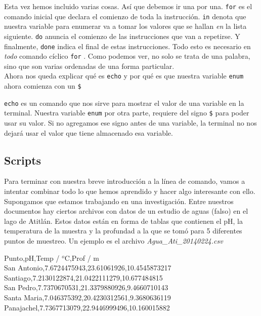 \documentclass[10pt,letterpaper]{article}
\newcommand{\inlinecode}[1]{
\colorbox{light-gray}{\texttt{#1}}
}
\newenvironment{Code}
{
\begin{lrbox}{\selvestebox}%
\begin{minipage}{\dimexpr\columnwidth-2\fboxsep\relax}
\fontfamily{\ttdefault}\selectfont
}
{\end{minipage}\end{lrbox}%
\begin{center}
\colorbox{light-gray}{\usebox{\selvestebox}}
\end{center}
}
\begin{document}
Esta vez hemos incluido varias cosas. As\'i que debemos ir una por una. \inlinecode{for} es el comando inicial que declara el comienzo de toda la instrucci\'on. \inlinecode{in} denota que nuestra variable para enumerar va a tomar los valores que se hallan \emph{en} la lista siguiente. \inlinecode{do} anuncia el comienzo de las instrucciones que van a repetirse. Y finalmente, \inlinecode{done} indica el final de estas instrucciones. Todo esto es necesario en \emph{todo} comando c\'iclico \inlinecode{for}. Como podemos ver, no solo se trata de una palabra, sino que son varias ordenadas de una forma particular.\\

Ahora nos queda explicar qu\'e es \inlinecode{echo} y por qu\'e es que nuestra variable \inlinecode{enum} ahora comienza con un \inlinecode{\$} \inlinecode{echo} es un comando que nos sirve para mostrar el valor de una variable en la terminal. Nuestra variable \inlinecode{enum} por otra parte, requiere del signo \inlinecode{\$} para poder usar su valor. Si no agregamos ese signo antes de una variable, la terminal no nos dejar\'a usar el valor que tiene almacenado esa variable.

\subsection{Scripts}
Para terminar con nuestra breve introducci\'on a la l\'inea de comando, vamos a intentar combinar todo lo que hemos aprendido y hacer algo interesante con ello. Supongamos que estamos trabajando en una investigaci\'on. Entre nuestros documentos hay ciertos archivos con datos de un estudio de aguas (falso) en el lago de Atitl\'an. Estos datos est\'an en forma de tablas que contienen el pH, la temperatura de la muestra y la profundad a la que se tom\'o para 5 diferentes puntos de muestreo. Un ejemplo es el archivo \emph{Agua\_Ati\_20140224.csv}\\

\begin{Code}
Punto,pH,Temp / $^o$C,Prof / m\\
San Antonio,7.6724475943,23.61061926,10.4545873217\\
Santiago,7.2130122874,21.0422111279,10.677484815\\
San Pedro,7.7370670531,21.3379880926,9.4660710143\\
Santa Maria,7.046375392,20.4230312561,9.3680636119\\
Panajachel,7.7367713079,22.9446999496,10.160015882
\end{Code}
\end{document}

